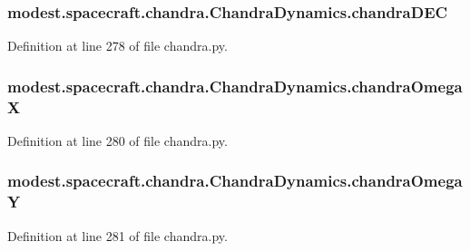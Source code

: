 \subsubsection[{\texorpdfstring{chandra\+D\+EC}{chandraDEC}}]{\setlength{\rightskip}{0pt plus 5cm}modest.\+spacecraft.\+chandra.\+Chandra\+Dynamics.\+chandra\+D\+EC}\hypertarget{classmodest_1_1spacecraft_1_1chandra_1_1ChandraDynamics_a5482dfa924b463375b2275805d0adb5e}{}\label{classmodest_1_1spacecraft_1_1chandra_1_1ChandraDynamics_a5482dfa924b463375b2275805d0adb5e}


Definition at line 278 of file chandra.\+py.

\subsubsection[{\texorpdfstring{chandra\+OmegaX}{chandraOmegaX}}]{\setlength{\rightskip}{0pt plus 5cm}modest.\+spacecraft.\+chandra.\+Chandra\+Dynamics.\+chandra\+OmegaX}\hypertarget{classmodest_1_1spacecraft_1_1chandra_1_1ChandraDynamics_afbde5ed043208401d1391e2508470a55}{}\label{classmodest_1_1spacecraft_1_1chandra_1_1ChandraDynamics_afbde5ed043208401d1391e2508470a55}


Definition at line 280 of file chandra.\+py.

\subsubsection[{\texorpdfstring{chandra\+OmegaY}{chandraOmegaY}}]{\setlength{\rightskip}{0pt plus 5cm}modest.\+spacecraft.\+chandra.\+Chandra\+Dynamics.\+chandra\+OmegaY}\hypertarget{classmodest_1_1spacecraft_1_1chandra_1_1ChandraDynamics_afa3400f2f4c4eece1e7f30b4b2417caa}{}\label{classmodest_1_1spacecraft_1_1chandra_1_1ChandraDynamics_afa3400f2f4c4eece1e7f30b4b2417caa}


Definition at line 281 of file chandra.\+py.


